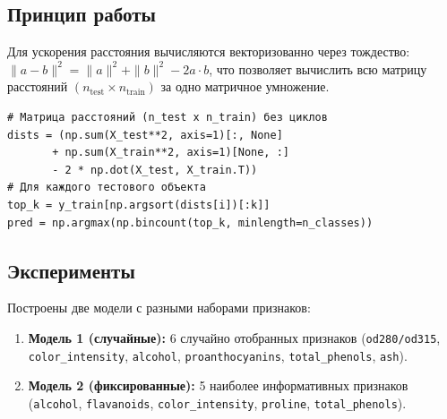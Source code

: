 \documentclass[12pt,a4paper]{article}
\begin{document}
\subsection{Принцип работы}


\medskip
Для ускорения расстояния вычисляются векторизованно через тождество:
\(\|a - b\|^2 = \|a\|^2 + \|b\|^2 - 2 a \cdot b\), что позволяет
вычислить всю матрицу расстояний \((n_{\text{test}} \times
n_{\text{train}})\) за одно матричное умножение.

\begin{lstlisting}[caption={Векторизованное вычисление расстояний и голосование},label={lst:knn}]
# Матрица расстояний (n_test x n_train) без циклов
dists = (np.sum(X_test**2, axis=1)[:, None]
       + np.sum(X_train**2, axis=1)[None, :]
       - 2 * np.dot(X_test, X_train.T))
# Для каждого тестового объекта
top_k = y_train[np.argsort(dists[i])[:k]]
pred = np.argmax(np.bincount(top_k, minlength=n_classes))
\end{lstlisting}

\subsection{Эксперименты}

Построены две модели с разными наборами признаков:
\begin{enumerate}
    \item \textbf{Модель 1 (случайные):} 6 случайно отобранных
          признаков (\texttt{od280/od315}, \texttt{color\_intensity},
          \texttt{alcohol}, \texttt{proanthocyanins},
          \texttt{total\_phenols}, \texttt{ash}).
    \item \textbf{Модель 2 (фиксированные):} 5 наиболее информативных
          признаков (\texttt{alcohol}, \texttt{flavanoids},
          \texttt{color\_intensity}, \texttt{proline},
          \texttt{total\_phenols}).
\end{enumerate}
\end{document}

